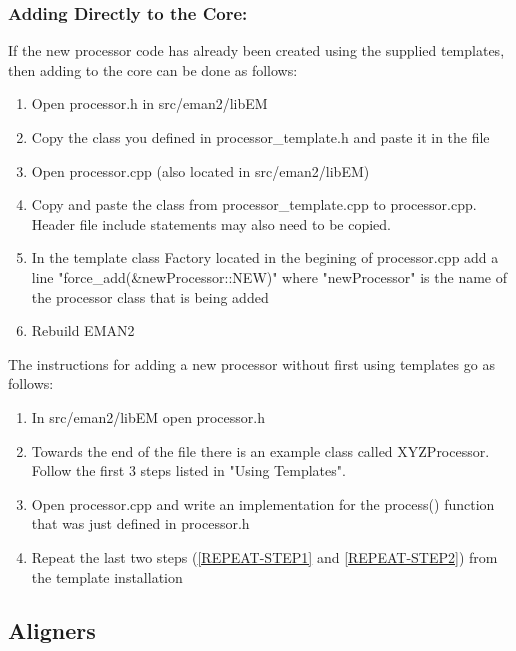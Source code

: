   \subsubsection{Adding Directly to the Core:}

  If the new processor code has already been created using the supplied
  templates, then adding to the core can be done as follows:
  \begin{enumerate}
    \item
      Open processor.h in src/eman2/libEM
    \item
      Copy the class you defined in processor\_template.h and paste it
      in the file
    \item
      Open processor.cpp (also located in src/eman2/libEM)
    \item
      Copy and paste the class from processor\_template.cpp to
      processor.cpp.  Header file include statements may also need to
      be copied.
    \item \label{REPEAT-STEP1}
      In the template class Factory located in the begining of
      processor.cpp add a line "force\_add(\&newProcessor::NEW)" where
      "newProcessor" is the name of the processor class that is being
      added 
   \item \label {REPEAT-STEP2}
     Rebuild EMAN2
  \end{enumerate}

  The instructions for adding a new processor without first using
  templates go as follows:
  \begin{enumerate}
    \item
      In src/eman2/libEM open processor.h
    \item
      Towards the end of the file there is an example class called
      XYZProcessor.  Follow the first 3 steps listed in "Using
      Templates". 
    \item
      Open processor.cpp and write an implementation for the process() 
      function that was just defined in processor.h
    \item
      Repeat the last two steps (\ref{REPEAT-STEP1} and \ref{REPEAT-STEP2})
      from the template installation
  \end{enumerate}

\subsection{Aligners} 
  \label{ADDING-ALIGNERS} 

